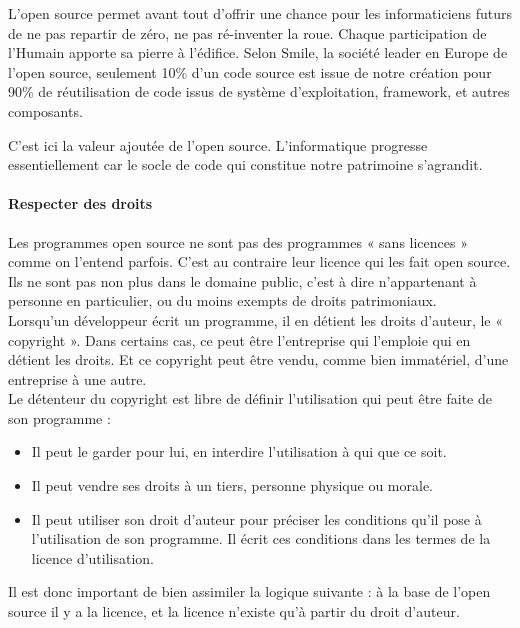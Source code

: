 					L'open source permet avant tout d'offrir une chance pour les informaticiens futurs de ne pas repartir de zéro, ne pas ré-inventer la roue. Chaque participation de l'Humain apporte sa pierre à l'édifice.
					Selon Smile, la société leader en Europe de l'open source, seulement 10\% d'un code source est issue de notre création pour 90\% de réutilisation de code issus de système d'exploitation, \gls{framework}, et autres composants.

					C'est ici la valeur ajoutée de l'open source. L'informatique progresse essentiellement car le socle de code qui constitue notre patrimoine s'agrandit.

				\paragraph{Respecter des droits\\}

					Les programmes open source ne sont pas des programmes « sans licences » comme on l'entend parfois. C'est au contraire leur licence qui les fait open source. Ils ne sont pas non plus dans le domaine public, c'est à dire n'appartenant à personne en particulier, ou du moins exempts de droits patrimoniaux.\\
					Lorsqu'un développeur écrit un programme, il en détient les droits d'auteur, le « copyright ». Dans certains cas, ce peut être l'entreprise qui l'emploie qui en détient les droits. Et ce copyright peut être vendu, comme bien immatériel, d'une entreprise à une autre.\\

					Le détenteur du copyright est libre de définir l'utilisation qui peut être faite de son programme : 

					\begin{itemize}[label=\textbullet, font=\LARGE \color{burntorange}]
						\item Il peut le garder pour lui, en interdire l'utilisation à qui que ce soit.
						\item Il peut vendre ses droits à un tiers, personne physique ou morale.
						\item Il peut utiliser son droit d'auteur pour préciser les conditions qu'il pose à l'utilisation de son programme. Il écrit ces conditions dans les termes de la licence d'utilisation.
					\end{itemize}
				
					Il est donc important de bien assimiler la logique suivante : à la base de l'open source il y a la licence, et la licence n'existe qu'à partir du droit d'auteur.\\

